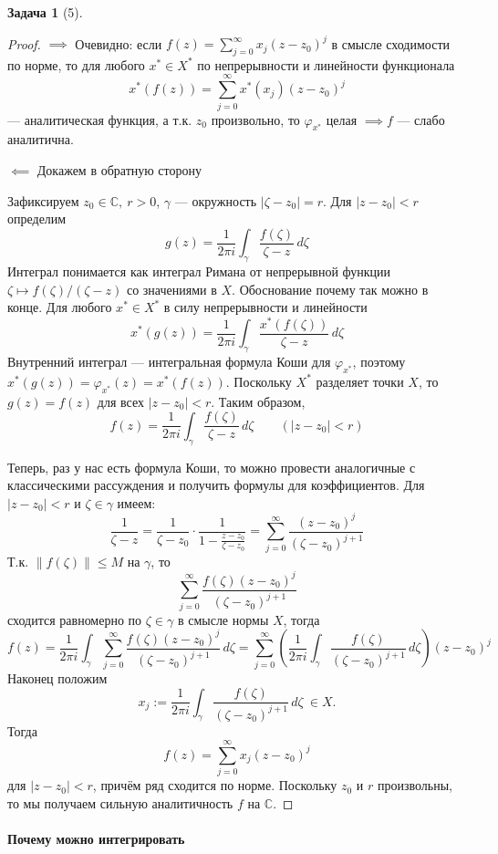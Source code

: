 \documentclass[a4paper,12pt]{article}
\newtheorem*{problem}{Задача}
\begin{document}
\begin{problem}[5]
\end{problem}
\begin{proof}
$\implies$ Очевидно: если $f(z)=\sum_{j=0}^\infty x_j(z-z_0)^j$ в смысле сходимости по норме, то для любого $x^*\in X^*$ по непрерывности и линейности функционала
\[
x^*(f(z))=\sum_{j=0}^\infty x^*(x_j)(z-z_0)^j
\]
--- аналитическая функция, а т.к. $z_0$ произвольно, то $\varphi_{x^*}$ целая $\implies f$ --- слабо аналитична.

$\impliedby$ Докажем в обратную сторону

Зафиксируем $z_0\in\mathbb{C}, \> r>0$, $\gamma$ --- окружность $|\zeta-z_0|=r$. Для $|z-z_0|<r$ определим
\[
g(z)=\frac{1}{2\pi i}\int_\gamma \frac{f(\zeta)}{\zeta-z}\,d\zeta
\]
Интеграл понимается как интеграл Римана от непрерывной функции $\zeta\mapsto f(\zeta)/(\zeta-z)$ со значениями в $X$. Обоснование почему так можно в конце. 
Для любого $x^*\in X^*$ в силу непрерывности и линейности
\[
x^*(g(z))=\frac{1}{2\pi i}\int_\gamma \frac{x^*(f(\zeta))}{\zeta-z}\,d\zeta
\]
Внутренний интеграл --- интегральная формула Коши для $\varphi_{x^*}$, поэтому $x^*(g(z))=\varphi_{x^*}(z)=x^*(f(z))$. 
Поскольку $X^*$ разделяет точки $X$, то $g(z)=f(z)$ для всех $|z-z_0|<r$. Таким образом,
\[
f(z)=\frac{1}{2\pi i}\int_\gamma \frac{f(\zeta)}{\zeta-z}\,d\zeta \qquad (|z-z_0|<r)
\]

Теперь, раз у нас есть формула Коши, то можно провести аналогичные с классическими рассуждения и получить формулы для коэффициентов.
Для $|z-z_0|<r$ и $\zeta\in\gamma$ имеем:
\[
\frac{1}{\zeta-z}=\frac{1}{\zeta-z_0}\cdot\frac{1}{1-\frac{z-z_0}{\zeta-z_0}}
= \sum_{j=0}^\infty \frac{(z-z_0)^j}{(\zeta-z_0)^{j+1}}
\]
Т.к. $\|f(\zeta)\|\le M$ на $\gamma$, то 
\[
\sum_{j=0}^\infty \frac{f(\zeta)(z-z_0)^j}{(\zeta-z_0)^{j+1}}
\]
сходится равномерно по $\zeta\in\gamma$ в смысле нормы $X$, тогда
\[
f(z)=\frac{1}{2\pi i}\int_\gamma \sum_{j=0}^\infty \frac{f(\zeta)(z-z_0)^j}{(\zeta-z_0)^{j+1}}\,d\zeta
= \sum_{j=0}^\infty \left(\frac{1}{2\pi i}\int_\gamma \frac{f(\zeta)}{(\zeta-z_0)^{j+1}}\,d\zeta\right) (z-z_0)^j
\]
Наконец положим
\[
x_j:=\frac{1}{2\pi i}\int_\gamma \frac{f(\zeta)}{(\zeta-z_0)^{j+1}}\,d\zeta \ \in X.
\]
Тогда
\[
f(z)=\sum_{j=0}^\infty x_j(z-z_0)^j
\]
для $|z-z_0|<r$, причём ряд сходится по норме. Поскольку $z_0$ и $r$ произвольны, то мы получаем сильную аналитичность $f$ на $\mathbb{C}$.
\end{proof}

\paragraph{\textbf{Почему можно интегрировать}}
\end{document}
